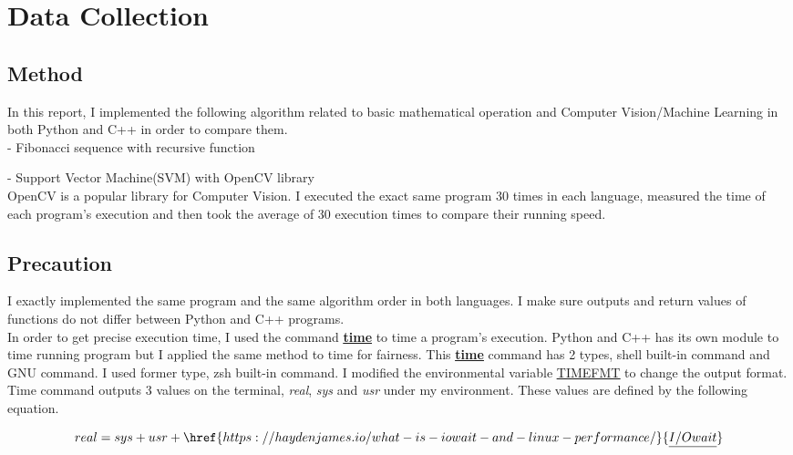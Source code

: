 \documentclass[11pt, a4paper]{article}
\begin{document}
\section{Data Collection}
\subsection{Method}
In this report, I implemented the following algorithm related to basic mathematical operation and Computer Vision/Machine Learning in both Python and C++ in order to compare them.\\

- Fibonacci sequence with recursive function 



- Support Vector Machine(SVM) with OpenCV library\\

OpenCV is a popular library for Computer Vision. I executed the exact same program 30 times in each language, measured the time of each program's execution and then took the average of 30 execution times to compare their running speed.

\subsection{Precaution}
I exactly implemented the same program and the same algorithm order in both languages. I make sure outputs and return values of functions do not differ between Python and C++ programs.\\

In order to get precise execution time, I used the command \href{https://en.wikipedia.org/wiki/Time_(Unix)}{\underline{\bf{time}}} to time a program's execution. Python and C++ has its own module to time running program but I applied the same method to time for fairness. This \href{https://linuxize.com/post/linux-time-command/}{\underline{\bf{time}}} command has 2 types, shell built-in command and GNU command. I used former type, zsh built-in command. I modified the environmental variable \href{https://unix.stackexchange.com/questions/453338/how-to-get-execution-millisecond-time-of-a-command-in-zsh}{\underline{TIMEFMT}} to change the output format. Time command outputs 3 values on the terminal, {\it real}, {\it sys}  and {\it usr} under my environment. These values are defined by the following equation. 

\begin{equation}
real = sys + usr + \href{https://haydenjames.io/what-is-iowait-and-linux-performance/}{\underline{I/Owait}}
\end{equation}
\end{document}

